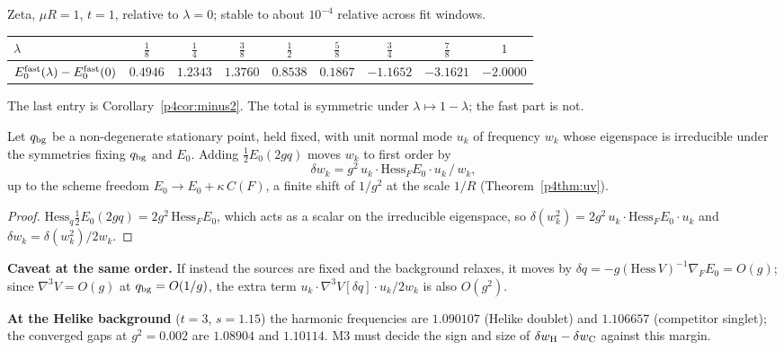 \begin{remark}\label{p4rem:table}
 Zeta, $\mu R=1$, $t=1$, relative to $\lambda=0$; stable to about $10^{-4}$ relative across fit windows.
\begin{center}\small
\begin{tabular}{@{}lcccccccc@{}}\toprule
$\lambda$ & $\tfrac18$ & $\tfrac14$ & $\tfrac38$ & $\tfrac12$ & $\tfrac58$ & $\tfrac34$ & $\tfrac78$ & $1$\\\midrule
$E_0^{\rm fast}(\lambda)-E_0^{\rm fast}(0)$ & $0.4946$ & $1.2343$ & $1.3760$ & $0.8538$ & $0.1867$ & $-1.1652$ & $-3.1621$ & $-2.0000$\\\bottomrule
\end{tabular}
\end{center}
The last entry is Corollary~\ref{p4cor:minus2}. The total is symmetric under $\lambda\mapsto1-\lambda$; the fast part is not.
\end{remark}

\begin{proposition}\label{p4prop:shift}
 Let $q_{\rm bg}$ be a non-degenerate stationary point, held fixed, with unit normal mode $u_k$ of
frequency $w_k$ whose eigenspace is irreducible under the symmetries fixing $q_{\rm bg}$ and $E_0$. Adding
$\tfrac12E_0(2gq)$ moves $w_k$ to first order by
\[
 \delta w_k=g^2\,u_k\cdot\mathrm{Hess}_FE_0\cdot u_k\,/\,w_k,
\]
up to the scheme freedom $E_0\to E_0+\kappa\,C(F)$, a finite shift of $1/g^2$ at the scale $1/R$ (Theorem~\ref{p4thm:uv}).
\end{proposition}
\begin{proof}
$\mathrm{Hess}_q\tfrac12E_0(2gq)=2g^2\,\mathrm{Hess}_FE_0$, which acts as a scalar on the irreducible eigenspace, so
$\delta(w_k^2)=2g^2\,u_k\cdot\mathrm{Hess}_FE_0\cdot u_k$ and $\delta w_k=\delta(w_k^2)/2w_k$.
\end{proof}
\noindent\textbf{Caveat at the same order.} If instead the sources are fixed and the background relaxes, it moves by
$\delta q=-g(\mathrm{Hess}\,V)^{-1}\nabla_FE_0=O(g)$; since $\nabla^3V=O(g)$ at $q_{\rm bg}=O(1/g)$, the extra term
$u_k\cdot\nabla^3V[\delta q]\cdot u_k/2w_k$ is also $O(g^2)$.

\textbf{At the Helike background} ($t=3$, $s=1.15$) the harmonic frequencies are $1.090107$ (Helike doublet) and $1.106657$
(competitor singlet); the converged gaps at $g^2=0.002$ are $1.08904$ and $1.10114$. M3 must decide the sign and size of
$\delta w_{\rm H}-\delta w_{\rm C}$ against this margin. \MthreeBackground

